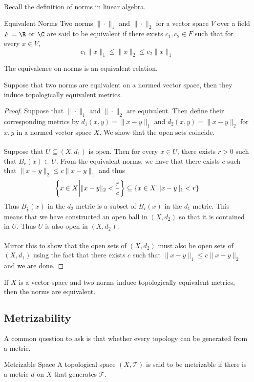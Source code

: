 Recall the definition of norms in linear algebra. 

\begin{defn}{Equivalent Norms}{} Two norms $\|\cdot\|_1$ and $\|\cdot\|_2$ for a vector space $V$ over a field $F=\R$ or $\C$ are said to be equivalent if there exists $c_1,c_2\in F$ such that for every $x\in V$, $$c_1\|x\|_1\leq\|x\|_2\leq c_2\|x\|_1$$
\end{defn}

\begin{prp}{}{} The equivalence on norms is an equivalent relation. 
\end{prp}

\begin{prp}{}{} Suppose that two norms are equivalent on a normed vector space, then they induce topologically equivalent metrics. \tcbline
\begin{proof}
Suppose that $\|\cdot\|_1$ and $\|\cdot\|_2$ are equivalent. Then define their corresponding metrics by $d_1(x,y)=\|x-y\|_1$ and $d_2(x,y)=\|x-y\|_2$ for $x,y$ in a normed vector space $X$. We show that the open sets coincide. \\~\\
Suppose that $U\subseteq(X,d_1)$ is open. Then for every $x\in U$, there exists $r>0$ such that $B_r(x)\subset U$. From the equivalent norms, we have that there exists $c$ such that $\|x-y\|_2\leq c\|x-y\|_1$ and thus $$\left\{x\in X\bigg{|}\|x-y\|_2<\frac{r}{c}\right\}\subseteq\{x\in X|\|x-y\|_1<r\}$$ Thus $B_{\frac{r}{c}}(x)$ in the $d_2$ metric is a subset of $B_r(x)$ in the $d_1$ metric. This means that we have constructed an open ball in $(X,d_2)$ so that it is contained in $U$. Thus $U$ is also open in $(X,d_2)$. \\~\\
Mirror this to show that the open sets of $(X,d_2)$ must also be open sets of $(X,d_1)$ using the fact that there exists $c$ such that $\|x-y\|_1\leq c\|x-y\|_2$ and we are done. 
\end{proof}
\end{prp}

\begin{lmm}{}{} If $X$ is a vector space and two norms induce topologically equivalent metrics, then the norms are equivalent. 
\end{lmm}

\subsection{Metrizability}
A common question to ask is that whether every topology can be generated from a metric. 
\begin{defn}{Metrizable Space}{} A topological space $(X,\mathcal{T})$ is said to be metrizable if there is a metric $d$ on $X$ that generates $\mathcal{T}$. 
\end{defn}

